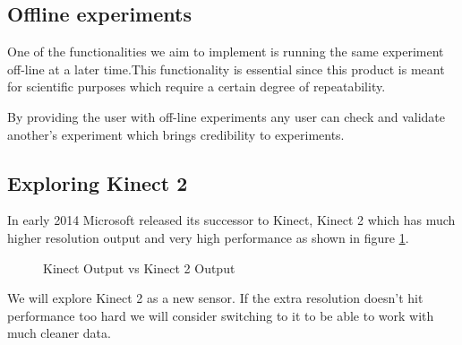 \subsection{Offline experiments}
One of the functionalities we aim to implement is running the same experiment off-line at a later time.This functionality is essential since this product is meant for scientific purposes which require a certain degree of repeatability.

By providing the user with off-line experiments any user can check and validate another's experiment which brings credibility to experiments.

\subsection{Exploring Kinect 2}
In early 2014 Microsoft released its successor to Kinect, Kinect 2 which has much higher resolution output and very high performance as shown in figure \ref{fig:KK2}.
\begin{figure}
    \centering
    \qquad
    \caption{Kinect Output vs Kinect 2 Output}
    \label{fig:KK2}
\end{figure}

We will explore Kinect 2 as a new sensor. If the extra resolution doesn't hit performance too hard we will consider switching to it to be able to work with much cleaner data. 